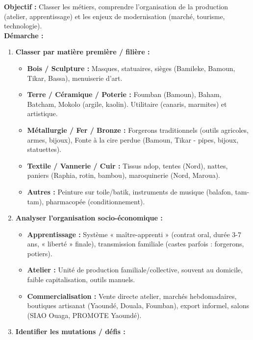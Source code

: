 \documentclass[11pt]{article}
\begin{document}
\begin{methode}
\textbf{Objectif :} Classer les métiers, comprendre l'organisation de la production (atelier, apprentissage) et les enjeux de modernisation (marché, tourisme, technologie).\\
\textbf{Démarche :}
\begin{enumerate}
    \item \textbf{Classer par matière première / filière :}
        \begin{itemize}
            \item \textbf{Bois / Sculpture :} Masques, statuaires, sièges (Bamileke, Bamoun, Tikar, Bassa), menuiserie d'art.
            \item \textbf{Terre / Céramique / Poterie :} Foumban (Bamoun), Baham, Batcham, Mokolo (argile, kaolin). Utilitaire (canaris, marmites) et artistique.
            \item \textbf{Métallurgie / Fer / Bronze :} Forgerons traditionnels (outils agricoles, armes, bijoux), Fonte à la cire perdue (Bamoun, Tikar - pipes, bijoux, statuettes).
            \item \textbf{Textile / Vannerie / Cuir :} Tissus ndop, tentes (Nord), nattes, paniers (Raphia, rotin, bambou), maroquinerie (Nord, Maroua).
            \item \textbf{Autres :} Peinture sur toile/batik, instruments de musique (balafon, tam-tam), pharmacopée (conditionnement).
        \end{itemize}
    \item \textbf{Analyser l'organisation socio-économique :}
        \begin{itemize}
            \item \textbf{Apprentissage :} Système « maître-apprenti » (contrat oral, durée 3-7 ans, « liberté » finale), transmission familiale (castes parfois : forgerons, potiers).
            \item \textbf{Atelier :} Unité de production familiale/collective, souvent au domicile, faible capitalisation, outils manuels.
            \item \textbf{Commercialisation :} Vente directe atelier, marchés hebdomadaires, boutiques artisanat (Yaoundé, Douala, Foumban), export informel, salons (SIAO Ouaga, PROMOTE Yaoundé).
        \end{itemize}
    \item \textbf{Identifier les mutations / défis :}
        \begin{itemize}

\end{itemize}
\end{enumerate}
\end{methode}
\end{document}
